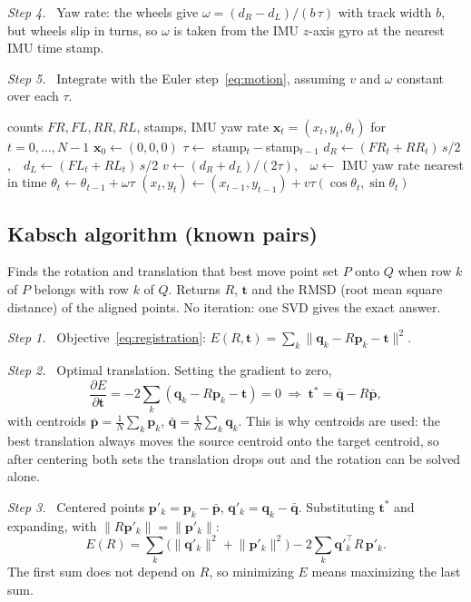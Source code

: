 \documentclass[letterpaper, 10pt, conference]{ieeeconf}
\newcommand{\p}{\mathbf{p}}
\newcommand{\q}{\mathbf{q}}
\newcommand{\tb}{\mathbf{t}}
\newcommand{\x}{\mathbf{x}}
\newcommand{\step}[1]{\par\noindent\textit{Step #1.}\ }
\newcommand{\summary}[1]{#1\par}
\begin{document}
\step{4} Yaw rate: the wheels give $\omega=(d_R-d_L)/(b\,\tau)$ with track
width $b$, but wheels slip in turns, so $\omega$ is taken from the IMU
$z$-axis gyro at the nearest IMU time stamp.

\step{5} Integrate with the Euler step~\eqref{eq:motion}, assuming $v$ and
$\omega$ constant over each $\tau$.

\begin{algorithm}[H]
\caption{Odometry}\label{alg:odometry}
\footnotesize
\begin{algorithmic}[1]
\Require counts $FR,FL,RR,RL$, stamps, IMU yaw rate
\Ensure $\x_t=(x_t,y_t,\theta_t)$ for $t=0,\dots,N-1$
\State $\x_0\gets(0,0,0)$
  \State $\tau\gets$ stamp$_t-$stamp$_{t-1}$
  \State $d_R\gets(FR_t+RR_t)\,s/2$,\ \ $d_L\gets(FL_t+RL_t)\,s/2$
  \State $v\gets(d_R+d_L)/(2\tau)$,\ \ $\omega\gets$ IMU yaw rate nearest in time
  \State $\theta_t\gets\theta_{t-1}+\omega\tau$
  \State $(x_t,y_t)\gets(x_{t-1},y_{t-1})+v\tau(\cos\theta_t,\sin\theta_t)$
\EndFor
\end{algorithmic}
\end{algorithm}

\subsection{Kabsch algorithm (known pairs)}

\summary{Finds the rotation and translation that best move point set $P$
onto $Q$ when row $k$ of $P$ belongs with row $k$ of $Q$. Returns $R$,
$\tb$ and the RMSD (root mean square distance) of the aligned points. No
iteration: one SVD gives the exact answer.}

\step{1} Objective~\eqref{eq:registration}:
$E(R,\tb)=\sum_k\lVert\q_k-R\p_k-\tb\rVert^2$.

\step{2} Optimal translation. Setting the gradient to zero,
\begin{equation}
\frac{\partial E}{\partial\tb}=-2\sum_k(\q_k-R\p_k-\tb)=0
\;\Rightarrow\;
\tb^*=\bar{\q}-R\bar{\p},
\end{equation}
with centroids $\bar{\p}=\frac1N\sum_k\p_k$, $\bar{\q}=\frac1N\sum_k\q_k$.
This is why centroids are used: the best translation always moves the
source centroid onto the target centroid, so after centering both sets the
translation drops out and the rotation can be solved alone.

\step{3} Centered points $\p'_k=\p_k-\bar{\p}$, $\q'_k=\q_k-\bar{\q}$.
Substituting $\tb^*$ and expanding, with $\lVert R\p'_k\rVert=\lVert\p'_k\rVert$:
\begin{equation}
E(R)=\sum_k\big(\lVert\q'_k\rVert^2+\lVert\p'_k\rVert^2\big)-2\sum_k\q'^\top_kR\,\p'_k .
\end{equation}
The first sum does not depend on $R$, so minimizing $E$ means maximizing the
last sum.
\end{document}
